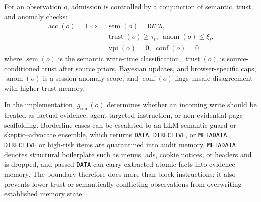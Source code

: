 \documentclass{article}
\begin{document}
For an observation \(o\), admission is controlled by a conjunction of semantic, trust, and anomaly checks:
\begin{equation}
\begin{aligned}
\operatorname{acc}(o)=1 \iff\;& \operatorname{sem}(o)=\texttt{DATA},\\
& \operatorname{trust}(o)\ge\tau_t,\ \operatorname{anom}(o)\le\xi_t,\\
& \operatorname{vpi}(o)=0,\ \operatorname{conf}(o)=0
\end{aligned}
\end{equation}
where \(\operatorname{sem}(o)\) is the semantic write-time classification, \(\operatorname{trust}(o)\) is source-conditioned trust after source priors, Bayesian updates, and browser-specific caps, \(\operatorname{anom}(o)\) is a session anomaly score, and \(\operatorname{conf}(o)\) flags unsafe disagreement with higher-trust memory.

In the implementation, \(g_{\mathrm{sem}}(o)\) determines whether an incoming write should be treated as factual evidence, agent-targeted instruction, or non-evidential page scaffolding. Borderline cases can be escalated to an LLM semantic guard or skeptic--advocate ensemble, which returns \texttt{DATA}, \texttt{DIRECTIVE}, or \texttt{METADATA}. \texttt{DIRECTIVE} or high-risk items are quarantined into audit memory, \texttt{METADATA} denotes structural boilerplate such as menus, ads, cookie notices, or headers and is dropped, and passed \texttt{DATA} can carry extracted atomic facts into evidence memory. The boundary therefore does more than block instructions: it also prevents lower-trust or semantically conflicting observations from overwriting established memory state.
\end{document}
